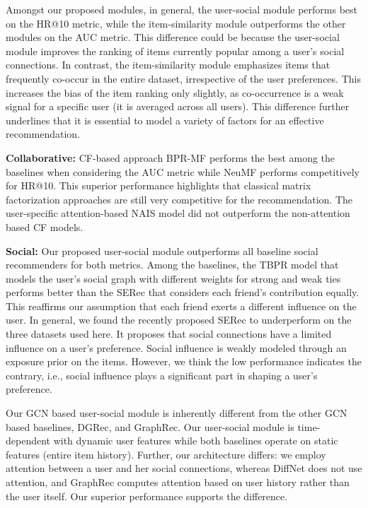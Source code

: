 Amongst our proposed modules, in general, the user-social module performs best on the HR@10 metric, while the item-similarity module outperforms the other modules on the AUC metric. This difference could be because the user-social module improves the ranking of items currently popular among a user's social connections.
In contrast, the item-similarity module emphasizes items that frequently co-occur in the entire dataset, irrespective of the user preferences. This increases the bias of the item ranking only slightly, as co-occurrence is a weak signal for a specific user (it is averaged across all users).
This difference further underlines that it is essential to model a variety of factors for an effective recommendation.

\textbf{Collaborative:} CF-based approach BPR-MF performs the best among the baselines when considering the AUC metric while NeuMF performs competitively for HR@10.
This superior performance highlights that classical matrix factorization approaches are still very competitive for the recommendation. The user-specific attention-based NAIS model did not outperform the non-attention based CF models.

\textbf{Social:} Our proposed user-social module outperforms all baseline social recommenders for both metrics.
Among the baselines, the TBPR model that models the user's social graph with different weights for strong and weak ties performs better than the SERec that considers each friend's contribution equally. This reaffirms our assumption that each friend exerts a different influence on the user. In general, we found the recently proposed SERec to underperform on the three datasets used here. It proposes that social connections have a limited influence on a user's preference.  Social influence is weakly modeled through an exposure prior on the items. However, we think the low performance indicates the contrary, i.e., social influence plays a significant part in shaping a user's preference.

Our GCN based user-social module is inherently different from the other GCN based baselines, DGRec, and GraphRec. Our user-social module is time-dependent with dynamic user features while both baselines operate on static features (entire item history). Further, our architecture differs: we employ attention between a user and her social connections, whereas DiffNet does not use attention, and GraphRec computes attention based on user history rather than the user itself. Our superior performance supports the difference.

